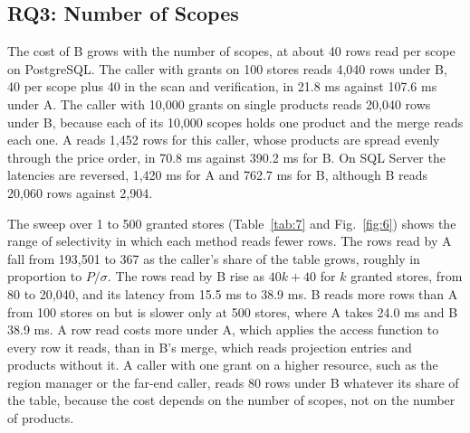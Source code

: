 \documentclass[conference]{IEEEtran}
\begin{document}
\subsection{RQ3: Number of Scopes}\label{sec-7-5}

The cost of B grows with the number of scopes, at about 40 rows read per scope on PostgreSQL. The caller with grants on 100 stores reads 4,040 rows under B, 40 per scope plus 40 in the scan and verification, in 21.8 ms against 107.6 ms under A. The caller with 10,000 grants on single products reads 20,040 rows under B, because each of its 10,000 scopes holds one product and the merge reads each one. A reads 1,452 rows for this caller, whose products are spread evenly through the price order, in 70.8 ms against 390.2 ms for B. On SQL Server the latencies are reversed, 1,420 ms for A and 762.7 ms for B, although B reads 20,060 rows against 2,904.

The sweep over 1 to 500 granted stores (Table~\ref{tab:7} and Fig.~\ref{fig:6}) shows the range of selectivity in which each method reads fewer rows. The rows read by A fall from 193,501 to 367 as the caller's share of the table grows, roughly in proportion to \(P/\sigma\). The rows read by B rise as \(40k + 40\) for \(k\) granted stores, from 80 to 20,040, and its latency from 15.5 ms to 38.9 ms. B reads more rows than A from 100 stores on but is slower only at 500 stores, where A takes 24.0 ms and B 38.9 ms. A row read costs more under A, which applies the access function to every row it reads, than in B's merge, which reads projection entries and products without it. A caller with one grant on a higher resource, such as the region manager or the far-end caller, reads 80 rows under B whatever its share of the table, because the cost depends on the number of scopes, not on the number of products.
\end{document}
